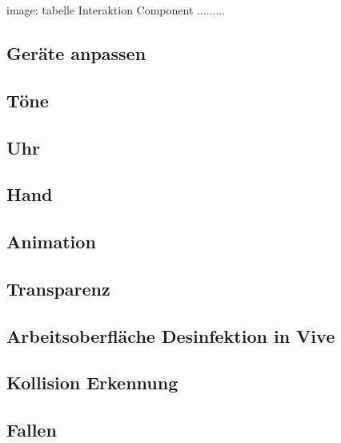   image: tabelle Interaktion Component .........
  
 \subsection{Geräte anpassen}
 \subsection{Töne}
 \subsection{Uhr}
 \subsection{Hand}
 
 \subsection{Animation}
 \subsection{Transparenz}
 
 \subsection{Arbeitsoberfläche Desinfektion in Vive}
 \subsection{Kollision Erkennung}
 \subsection{Fallen}


